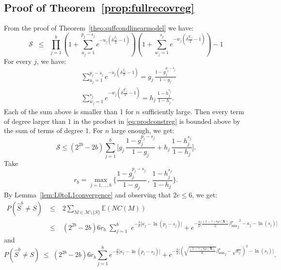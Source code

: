 \documentclass[aos]{imsart}
\theoremstyle{plain}
\newcommand{\E}{\mathbb{E}}
\newcommand{\M}{\mathcal{M}}
\newcommand{\bs}{\boldsymbol}
\begin{document}
 \subsection{Proof of Theorem~\ref{prop:fullrecovreg}}
From the proof of Theorem~\ref{theo:suffcondlinearmodel} we have:
\begin{equation}\label{eq:prodconstreg}
    \mathcal{S} \;\;\leq\;\; \prod_{j=1}^b\left(1+\sum_{u_j=1}^{p_j-s_j}e^{-u_j\left(\delta \tfrac{f_j}{2}-1\right)}\right)\left(1+
    \sum_{w_j=1}^{s_j}    e^{-w_j\left(\delta \tfrac{g'_j}{2}-1\right)}\right) - 1
\end{equation}
For every $j$, we have:
\begin{eqnarray*}
    &\sum_{u_j=1}^{p_j-s_j}e^{-u_j\left(\delta \tfrac{f_j}{2}-1\right)}
    =g_j\,\frac{1-g_j^{p_j-s_j}}{1-g_j} \\
    &\sum_{w_j=1}^{s_j}    e^{-w_j\left(\delta \tfrac{g'_j}{2}-1\right)} =h_j\,\frac{1-h_j^{s_j}}{1-h_j}.
\end{eqnarray*}
Each of the sum above is smaller than 1 for $n$ sufficiently large. Then every term of degree larger than 1 in the product in \eqref{eq:prodconstreg} is bounded above by the sum of terms of degree 1. For $n$ large enough, we get: 
 \begin{equation*} \mathcal{S} \leq (2^{2b}-2b)\sum_{j=1}^b \bigg[g_j\,\frac{1-g_j^{p_j-s_j}}{1-g_j}+ h_j\,\frac{1-h_j^{s_j}}{1-h_j}\bigg ]. \end{equation*} 
 Take $$r_b=\max_{j=1,\ldots,b}\bigg\{\frac{1-g_j^{p_j-s_j}}{1-g_j} \,,\,\frac{1-h_j^{s_j}}{1-h_j} \bigg\}.$$
 By Lemma~\ref{lem:L0toL1convergence} and observing that $2e \leq 6$, we get: 
 \begin{eqnarray*}
     P(\hat{S}^{b} \neq S)\;&\leq&\;  2 \sum_{M \in \M\setminus \{S\}} \E\left(NC(M)\right) \\\;&\leq&\; (2^{2b}-2b)6r_b\,\,\sum_{j=1}^b\,\, e^{-\tfrac{\delta}{2}\big[\kappa_j-\ln(p_j-s_j)\big]} + e^{-\tfrac{\delta}{2}\big[\frac{(1-\gamma) n\rho(\bs X)}{2}{{\beta_{\min}^{\star}}_j}^2 - \kappa_j -\ln(s_j) \big]}
 \end{eqnarray*}
and 
 $$ P(\hat{S}^{b} \neq S)\;\leq \;(2^{2b}-2b)6r_b\sum_{j=1}^b e^{-\tfrac{\delta}{2}\big[\kappa_j-\ln(p_j-s_j)\big]} + e^{-\tfrac{\delta}{2}\big[(\sqrt{\frac{(1-\gamma) n\rho(\bs X)}{6}}{{\beta_{\min}^{\star}}_j} - \sqrt{\kappa_j})^2 -\ln(s_j) \big]}.$$
\end{document}
